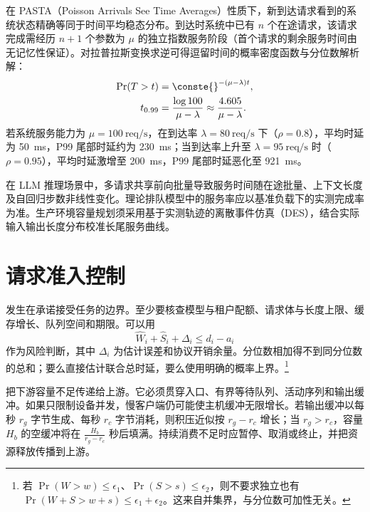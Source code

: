 \documentclass[../textbook.tex]{subfiles}
\begin{document}
在 PASTA（Poisson Arrivals See Time Averages）性质下，新到达请求看到的系统状态精确等同于时间平均稳态分布。到达时系统中已有 $n$ 个在途请求，该请求完成需经历 $n+1$ 个参数为 $\mu$ 的独立指数服务阶段（首个请求的剩余服务时间由无记忆性保证）。对拉普拉斯变换求逆可得逗留时间的概率密度函数与分位数解析解：
\begin{equation}\label{eq:schedule-mm1-tail}
 \begin{aligned}
  \Pr(T>t)&=\conste{}^{-(\mu-\lambda)t},\\
  t_{0.99}&=\frac{\log 100}{\mu-\lambda}\approx \frac{4.605}{\mu-\lambda}.
 \end{aligned}
\end{equation}
若系统服务能力为 $\mu=100\ \text{req/s}$，在到达率 $\lambda=80\ \text{req/s}$ 下（$\rho=0.8$），平均时延为 \qty{50}{\milli\second}，P99 尾部时延约为 \qty{230}{\milli\second}；当到达率上升至 $\lambda=95\ \text{req/s}$ 时（$\rho=0.95$），平均时延激增至 \qty{200}{\milli\second}，P99 尾部时延恶化至 \qty{921}{\milli\second}。

\begin{note}[服务曲线的动态演化与测量基准]
在 LLM 推理场景中，多请求共享前向批量导致服务时间随在途批量、上下文长度及自回归步数非线性变化。理论排队模型中的服务率应以基准负载下的实测完成率为准。生产环境容量规划须采用基于实测轨迹的离散事件仿真（DES），结合实际输入输出长度分布校准长尾服务曲线。
\end{note}

\section{请求准入控制}

发生在承诺接受任务的边界。至少要核查模型与租户配额、请求体与长度上限、缓存增长、队列空间和期限。可以用
\begin{equation}
 \widehat W_i+\widehat S_i+\Delta_i\le d_i-a_i
 \label{eq:schedule-admission}
\end{equation}
作为风险判断，其中 $\Delta_i$ 为估计误差和协议开销余量。分位数相加得不到同分位数的总和；要么直接估计联合总时延，要么使用明确的概率上界。\footnote{若 $\Pr(W>w)\le\epsilon_1$、$\Pr(S>s)\le\epsilon_2$，则不要求独立也有 $\Pr(W+S>w+s)\le\epsilon_1+\epsilon_2$。这来自并集界，与分位数可加性无关。}

把下游容量不足传递给上游。它必须贯穿入口、有界等待队列、活动序列和输出缓冲。如果只限制设备并发，慢客户端仍可能使主机缓冲无限增长。若输出缓冲以每秒 $r_g$ 字节生成、每秒 $r_c$ 字节消耗，则积压近似按 $r_g-r_c$ 增长；当 $r_g>r_c$，容量 $H_b$ 的空缓冲将在 $\frac{H_b}{r_g-r_c}$ 秒后填满。持续消费不足时应暂停、取消或终止，并把资源释放传播到上游。
\end{document}
